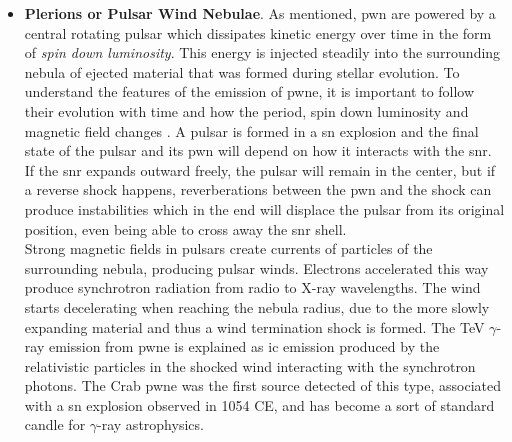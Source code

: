 \documentclass[main.tex]{subfiles}
\begin{document}
\begin{itemize}
    A more detailed analysis using real data of galactic \gls{snr} was done by \cite{2016originCR} arriving at the conclusion that future $\gamma$-ray data can be used to constrain the amount of \gls{cr} energy coming from \gls{snr}. However, there are still problems on proving this hypothesis because many of the $\gamma$-ray signatures coming from \gls{snr} have a leptonic origin rather than hadronic. Also, for \gls{snr} to reproduce the full spectrum of \gls{cr}, \glspl{snr} should be pevatrons (meaning they can accelerate \gls{cr} to PeV energies) at some fraction of their lifetimes, to reach the region after the \textit{knee}. Still, no \gls{snr} pevatron has been observed yet but high hopes are deposited in the next generation of $\gamma$-ray experiments \cite{2018SNRPevatrons}.\\
    \item \textbf{Plerions or Pulsar Wind Nebulae}. As mentioned, \gls{pwn} are powered by a central rotating pulsar which dissipates kinetic energy over time in the form of \textit{spin down luminosity}. This energy is injected steadily into the surrounding nebula of ejected material that was formed during stellar evolution. To understand the features of the emission of \gls{pwne}, it is important to follow their evolution with time and how the period, spin down luminosity and magnetic field changes \cite{2006PWNe}. A pulsar is formed in a \gls{sn} explosion and the final state of the pulsar and its \gls{pwn} will depend on how it interacts with the \gls{snr}. If the \gls{snr} expands outward freely, the pulsar will remain in the center, but if a reverse shock happens, reverberations between the \gls{pwn} and the shock can produce instabilities which in the end will displace the pulsar from its original position, even being able to cross away the \gls{snr} shell.\\
    Strong magnetic fields in pulsars create currents of particles of the surrounding nebula, producing pulsar winds. Electrons accelerated this way produce synchrotron radiation from radio to X-ray wavelengths. The wind starts decelerating when reaching the nebula radius, due to the more slowly expanding material and thus a wind termination shock is formed. The TeV $\gamma$-ray emission from \gls{pwne} is explained as \gls{ic} emission produced by the relativistic particles in the shocked wind interacting with the synchrotron photons.
    The Crab \gls{pwne} was the first source detected of this type, associated with a \gls{sn} explosion observed in 1054 CE, and has become a sort of standard candle for $\gamma$-ray astrophysics.\\
    

\end{itemize}
\end{document}
